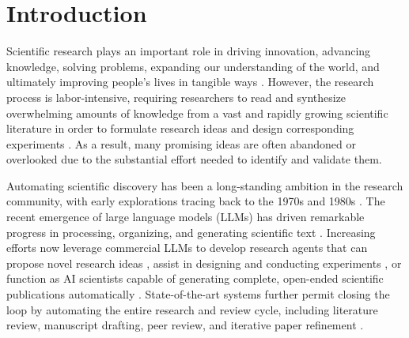 \documentclass[manuscript,review,anonymous]{acmart}
\begin{document}

\maketitle

\section{Introduction}
Scientific research plays an important role in driving innovation, advancing knowledge, solving problems, expanding our understanding of the world, and ultimately improving people's lives in tangible ways \cite{wang2023scientific}. However, the research process is labor-intensive, requiring researchers to read and synthesize overwhelming amounts of knowledge from a vast and rapidly growing scientific literature in order to formulate research ideas and design corresponding experiments \cite{hope2023computational}. As a result, many promising ideas are often abandoned or overlooked due to the substantial effort needed to identify and validate them.

Automating scientific discovery has been a long-standing ambition in the research community, with early explorations tracing back to the 1970s and 1980s \cite{langley1987scientific}. The recent emergence of large language models (LLMs) \cite{achiam2023gpt} has driven remarkable progress in processing, organizing, and generating scientific text \cite{wang2023scientific}. Increasing efforts now leverage commercial LLMs to develop research agents that can propose novel research ideas \cite{wang2023scimon,yang2024large,baek2025researchagent}, assist in designing and conducting experiments \cite{du2024llms}, or function as AI scientists capable of generating complete, open-ended scientific publications automatically \cite{lu2024ai,yamada2025ai}. State-of-the-art systems further permit closing the loop by automating the entire research and review cycle, including literature review, manuscript drafting, peer review, and iterative paper refinement \cite{weng2025cycleresearcher}.
\end{document}
